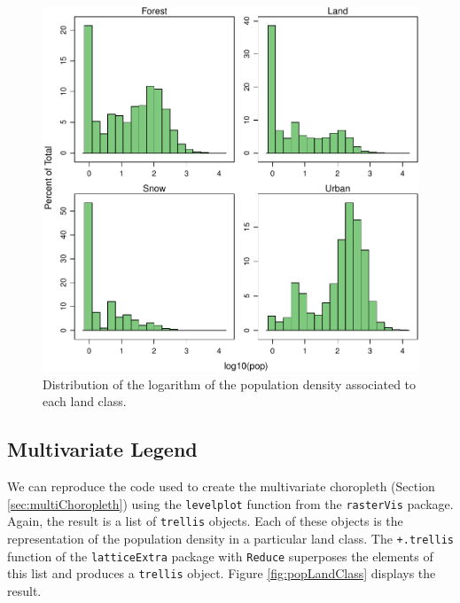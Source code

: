 \begin{figure}[htb]
\centering
\includegraphics[width=.9\linewidth]{figs/histogramLandClass.pdf}
\caption{\label{fig:histogramLandClass}Distribution of the logarithm of the population density associated to each land class.}
\end{figure}

\subsection{\floweroneleft  Multivariate Legend}
\label{sec-1-3}
We can reproduce the code used to create the multivariate
choropleth (Section \ref{sec:multiChoropleth}) using the
\texttt{levelplot} function from the \texttt{rasterVis} package. Again, the
result is a list of \texttt{trellis} objects. Each of these objects is
the representation of the population density in a particular land
class. The \texttt{+.trellis} function of the \texttt{latticeExtra} package with
\texttt{Reduce} superposes the elements of this list and produces a
\texttt{trellis} object. Figure \ref{fig:popLandClass} displays the
result.




